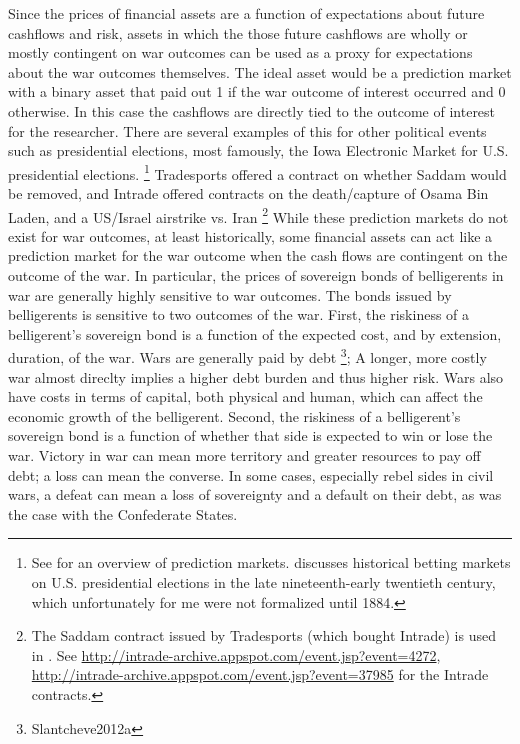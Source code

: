 Since the prices of financial assets are a function of expectations about future cashflows and risk, assets in which the those future cashflows are wholly or mostly contingent on war outcomes can be used as a proxy for expectations about the war outcomes themselves.
The ideal asset would be a prediction market with a binary asset that paid out 1 if the war outcome of interest occurred and 0 otherwise.
In this case the cashflows are directly tied to the outcome of interest for the researcher.
There are several examples of this for other political events such as presidential elections, most famously, the Iowa Electronic Market for U.S. presidential elections.%
\footnote{
  See \textcite{WolfersZitzewitz2004} for an overview of prediction markets.
  \textcite{RhodeStrumpf2004a} discusses historical betting markets on U.S. presidential elections in the late nineteenth-early twentieth century, which unfortunately for me were not formalized until 1884.
}
Tradesports offered a contract on whether Saddam would be removed, and Intrade offered contracts on the death/capture of Osama Bin Laden, and a US/Israel airstrike vs. Iran
\footnote{
  The Saddam contract issued by Tradesports (which bought Intrade) is used in \textcite{LeighWolfersEtAl2003}.
  See \url{http://intrade-archive.appspot.com/event.jsp?event=4272}, \url{http://intrade-archive.appspot.com/event.jsp?event=37985} for the Intrade contracts.
}
While these prediction markets do not exist for war outcomes, at least historically, some financial assets can act like a prediction market for the war outcome when the cash flows are contingent on the outcome of the war. 
In particular, the prices of sovereign bonds of belligerents in war are generally highly sensitive to war outcomes.
The bonds issued by belligerents is sensitive to two outcomes of the war.
First, the riskiness of a belligerent's sovereign bond is a function of the expected cost, and by extension, duration, of the war. 
Wars are generally paid by debt \footnote{Slantcheve2012a}; A longer, more costly war almost direclty implies a higher debt burden and thus higher risk.
Wars also have costs in terms of capital, both physical and human, which can affect the economic growth of the belligerent.
Second, the riskiness of a belligerent's sovereign bond is a function of whether that side is expected to win or lose the war.
Victory in war can mean more territory and greater resources to pay off debt; a loss can mean the converse.
In some cases, especially rebel sides in civil wars, a defeat can mean a loss of sovereignty and a default on their debt, as was the case with the Confederate States.%
